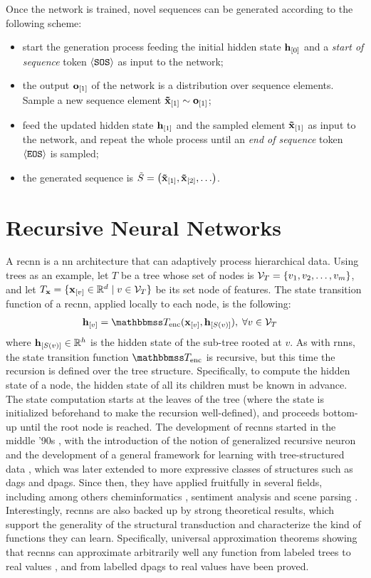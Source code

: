 Once the network is trained, novel sequences can be generated according to the following scheme:
\begin{itemize}
    \item start the generation process feeding the initial hidden state $\Elem{h}{0}$ and a \emph{start of sequence} token $\mathtt{\langle SOS \rangle}$ as input to the network;
    \item the output $\Elem{o}{1}$ of the network is a distribution over sequence elements. Sample a new sequence element $\Elem{\tilde{x}}{1} \sim \Elem{o}{1}$;
    \item feed the updated hidden state $\Elem{h}{1}$ and the sampled element $\Elem{\tilde{x}}{1}$ as input to the network, and repeat the whole process until an \emph{end of sequence} token $\mathtt{\langle EOS \rangle}$ is sampled;
    \item the generated sequence is $\tilde{S} = \Seq{\Elem{\tilde{x}}{1}, \Elem{\tilde{x}}{2}, \ldots}$.
\end{itemize}

\section{Recursive Neural Networks}
A \gls{recnn} is a \gls{nn} architecture that can adaptively process hierarchical data. Using trees as an example, let $T$ be a tree whose set of nodes is $\Cal{V}_T = \Set{v_1, v_2, \ldots, v_m}$, and let $T_{\Vector{x}} = \Set{\Elem{x}{v} \in \Real^d \mid v \in \Cal{V}_T}$ be its set node of features. The state transition function of a \gls{recnn}, applied locally to each node, is the following:
\begin{align*}
    \Elem{h}{v} &= \Transduction_{\Fun{enc}}(\Elem{x}{v}, \Elem{h}{S(v)}), \; \forall v \in \Cal{V}_T
\end{align*}
where $\Elem{h}{S(v)} \in \Real^h$ is the hidden state of the sub-tree rooted at $v$. As with \glspl{rnn}, the state transition function $\Transduction_{\Fun{enc}}$ is recursive, but this time the recursion is defined over the tree structure. Specifically, to compute the hidden state of a node, the hidden state of all its children must be known in advance. The state computation starts at the leaves of the tree (where the state is initialized beforehand to make the recursion well-defined), and proceeds bottom-up until the root node is reached.
The development of \glspl{recnn} started in the middle '90s \cite{?}, with the introduction of the notion of generalized recursive neuron \cite{?} and the development of a general framework for learning with tree-structured data \cite{?}, which was later extended to more expressive classes of structures such as \glspl{dag} and \glspl{dpag}. Since then, they have applied fruitfully in several fields, including among others cheminformatics \cite{?}, sentiment analysis \cite{?} and scene parsing \cite{?}. Interestingly, \glspl{recnn} are also backed up by strong theoretical results, which support the generality of the structural transduction and characterize the kind of functions they can learn. Specifically, universal approximation theorems showing that \glspl{recnn} can approximate arbitrarily well any function from labeled trees to real values \cite{?}, and from labelled \glspl{dpag} to real values \cite{?} have been proved.

